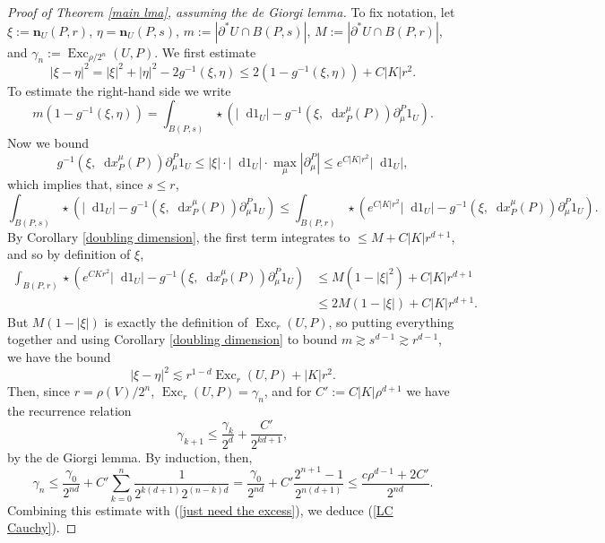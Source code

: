 \documentclass[reqno,10pt]{amsart}
\newcommand{\RR}{\mathbf{R}}
\DeclareMathOperator{\Exc}{Exc}
\newcommand*\dif{\mathop{}\!\mathrm{d}}
\newcommand{\normal}{\mathbf n}
\def\Japan#1{\left \langle #1 \right \rangle}
\theoremstyle{definition}
\numberwithin{equation}{section}
\begin{document}
\begin{proof}[Proof of Theorem \ref{main lma}, assuming the de Giorgi lemma]
To fix notation, let
$\xi := \normal_U(P, r)$, $\eta = \normal_U(P, s)$, $m := |\partial^* U \cap B(P, s)|$, $M := |\partial^* U \cap B(P, r)|$, and $\gamma_n := \Exc_{\rho/2^n}(U, P)$.
We first estimate
$$|\xi - \eta|^2 = |\xi|^2 + |\eta|^2 - 2 g^{-1}(\xi, \eta) \leq 2(1 - g^{-1}(\xi, \eta)) + C|K|r^2.$$
To estimate the right-hand side we write 
$$m(1 - g^{-1}(\xi, \eta)) = \int_{B(P, s)} \star(|\dif 1_U| - g^{-1}(\xi, \dif x^\mu_P(P)) \partial^P_\mu 1_U).$$
Now we bound 
$$ g^{-1}(\xi, \dif x^\mu_P(P)) \partial^P_\mu 1_U \leq |\xi| \cdot |\dif 1_U| \cdot \max_\mu |\partial^P_\mu| \leq e^{C|K|r^2} |\dif 1_U|,$$
which implies that, since $s \leq r$,
$$\int_{B(P, s)} \star(|\dif 1_U| - g^{-1}(\xi, \dif x^\mu_P(P)) \partial^P_\mu 1_U) \leq \int_{B(P, r)} \star(e^{C|K|r^2} |\dif 1_U| - g^{-1}(\xi, \dif x^\mu_P(P)) \partial^P_\mu 1_U).$$
By Corollary \ref{doubling dimension}, the first term integrates to $\leq M + C|K|r^{d + 1}$, and so by definition of $\xi$,
\begin{align*}
\int_{B(P, r)} \star(e^{CKr^2} |\dif 1_U| - g^{-1}(\xi, \dif x^\mu_P(P)) \partial^P_\mu 1_U) &\leq M(1 - |\xi|^2) + C|K|r^{d + 1}\\
&\leq 2M(1 - |\xi|) + C|K|r^{d + 1}.
\end{align*}
But $M(1 - |\xi|)$ is exactly the definition of $\Exc_r(U, P)$, so putting everything together and using Corollary \ref{doubling dimension} to bound $m \gtrsim s^{d - 1} \gtrsim r^{d - 1}$, we have the bound 
\begin{equation}\label{just need the excess}
|\xi - \eta|^2 \lesssim r^{1 - d} \Exc_r(U, P) + |K|r^2.
\end{equation}
Then, since $r = \rho(V)/2^n$, $\Exc_r(U, P) = \gamma_n$, and for $C' := C|K|\rho^{d + 1}$ we have the recurrence relation 
$$\gamma_{k + 1} \leq \frac{\gamma_k}{2^d} + \frac{C'}{2^{k{d + 1}}},$$
by the de Giorgi lemma.
By induction, then,
$$\gamma_n \leq \frac{\gamma_0}{2^{nd}} + C' \sum_{k=0}^n \frac{1}{2^{k(d + 1)} 2^{(n - k)d}} = \frac{{\gamma_0}}{2^{nd}} + C' \frac{2^{n + 1} - 1}{2^{n(d + 1)}} \leq \frac{c\rho^{d - 1} + 2C'}{2^{nd}}.$$
Combining this estimate with (\ref{just need the excess}), we deduce (\ref{LC Cauchy}).
\end{proof}



\end{document}
